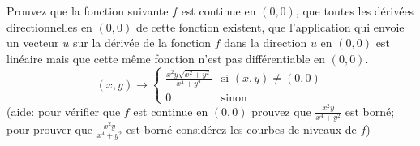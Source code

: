 
\begin{exercice}\label{exo0048}

Prouvez que la fonction suivante $f$ est continue en $(0,0)$,
que toutes les dérivées directionnelles en $(0,0)$ de cette fonction
existent, que l'application qui envoie un vecteur $u$ sur la dérivée de
la fonction $f$ dans la direction $u$ en $(0,0)$ est linéaire mais que
cette même fonction n'est pas différentiable en $(0,0)$.
\[ (x,y) \rightarrow \left\{ \begin{array}{ll}
\frac{x^2y\sqrt{x^2+y^2}}{x^4+y^2} & \mbox{si }(x,y) \not= (0,0) \\
0 & \mbox{sinon}
\end{array} \right. \]
(aide: pour vérifier que $f$ est continue en $(0,0)$ prouvez que
$\frac{x^2y}{x^4+y^2}$ est borné; pour prouver que $\frac{x^2y}{x^4+y^2}$
est borné considérez les courbes de niveaux de $f$)


\end{exercice}
